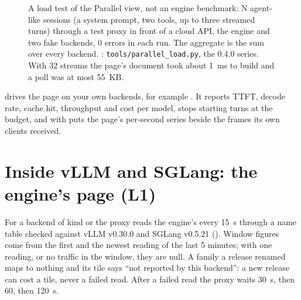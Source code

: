\begin{figure}[htbp]
\centering
{}
\caption[A load test of the Parallel view]{A load test of the Parallel view, not an engine benchmark: N agent-like sessions (a system prompt, two tools, up to three streamed turns) through a test proxy in front of a cloud API, the engine and two fake backends, 0 errors in each run. The aggregate is the sum over every backend. \measured: \texttt{tools/parallel\_load.py}, the 0.4.0 series. With 32 streams the page's document took about 1~ms to build and a poll was at most 55~KB.}\label{fig:parallel}
\end{figure}

 drives the page on your own backends, for example . It reports TTFT, decode rate, cache hit, throughput and cost per model, stops starting turns at the budget, and with  puts the page's per-second series beside the frames its own clients received.

\section{Inside vLLM and SGLang: the engine's page (L1)}

For a backend of kind  or  the proxy reads the engine's  every 15~s through a name table checked against vLLM v0.30.0 and SGLang v0.5.21 (). Window figures come from the first and the newest reading of the last 5 minutes; with one reading, or no traffic in the window, they are null. A family a release renamed maps to nothing and its tile says \enquote{not reported by this backend}: a new release can cost a tile, never a failed read. After a failed read the proxy waits 30~s, then 60, then 120~s.

